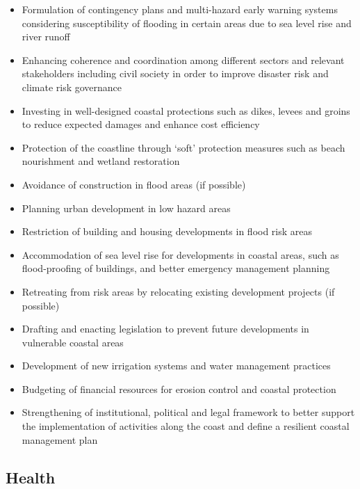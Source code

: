 \documentclass[
]{book}
\providecommand{\tightlist}{%
  \setlength{\itemsep}{0pt}\setlength{\parskip}{0pt}}
\begin{document}
\begin{itemize}
\tightlist
\item
  Formulation of contingency plans and multi-hazard early warning systems considering susceptibility of flooding in certain areas due to sea level rise and river runoff
\item
  Enhancing coherence and coordination among different sectors and relevant stakeholders including civil society in order to improve disaster risk and climate risk governance
\item
  Investing in well-designed coastal protections such as dikes, levees and groins to reduce expected damages and enhance cost efficiency
\item
  Protection of the coastline through `soft' protection measures such as beach nourishment and wetland restoration
\item
  Avoidance of construction in flood areas (if possible)
\item
  Planning urban development in low hazard areas
\item
  Restriction of building and housing developments in flood risk areas
\item
  Accommodation of sea level rise for developments in coastal areas, such as flood-proofing of buildings, and better emergency management planning
\item
  Retreating from risk areas by relocating existing development projects (if possible)
\item
  Drafting and enacting legislation to prevent future developments in vulnerable coastal areas
\item
  Development of new irrigation systems and water management practices
\item
  Budgeting of financial resources for erosion control and coastal protection
\item
  Strengthening of institutional, political and legal framework to better support the implementation of activities along the coast and define a resilient coastal management plan
\end{itemize}

\hypertarget{health-1}{%
\subsection{Health}\label{health-1}}
\end{document}
